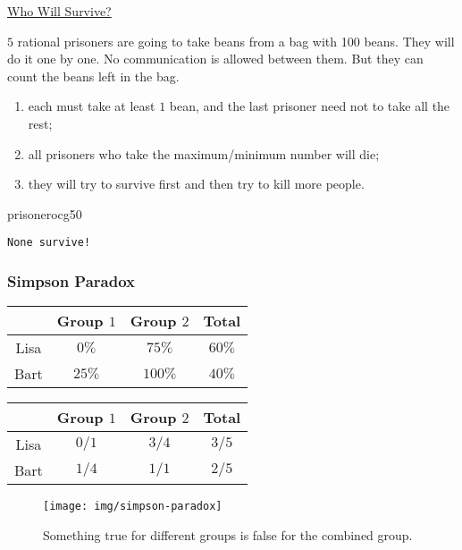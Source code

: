 \documentclass[UTF8,11pt,colorlinks,compress,openany]{beamer}%
\begin{document}
\begin{frame}[fragile]{\href{https://www.zhihu.com/question/19912025/answer/99088775}{Who Will Survive?}}
	\begin{problem}
		$5$ rational prisoners are going to take beans from a bag with 100 beans. They will do it one by one. No communication is allowed between them. But they can count the beans left in the bag.
		\begin{enumerate}
			\item each must take at least $1$ bean, and the last prisoner need not to take all the rest;
			\item all prisoners who take the maximum/minimum number will die;
			\item they will try to survive first and then try to kill more people.
		\end{enumerate}
	\end{problem}
\begin{ocg}{prisoner}{ocg5}{0}
\begin{verbatim}
None survive!
\end{verbatim}
\end{ocg}
\end{frame}

\begin{frame}\frametitle{Simpson Paradox}
\begin{center}
\begin{tabu}{c|ccc}
\hline
 & Group $1$ & Group $2$ & Total\\
\hline
Lisa & $0\%$ & $75\%$ & $60\%$\\
Bart & $25\%$ & $100\%$ & $40\%$\\
\hline
\end{tabu}\;\;
\begin{tabu}{c|ccc}
\hline
 & Group $1$ & Group $2$ & Total\\
\hline
Lisa & $0/1$ & $3/4$ & $3/5$\\
Bart & $1/4$ & $1/1$ & $2/5$\\
\hline
\end{tabu}
\end{center}
\begin{figure}
	\texttt{[image: img/simpson-paradox]}\vspace{-1ex}\caption{Something true for different groups is false for the combined group.}
\end{figure}
\end{frame}
\end{document}
